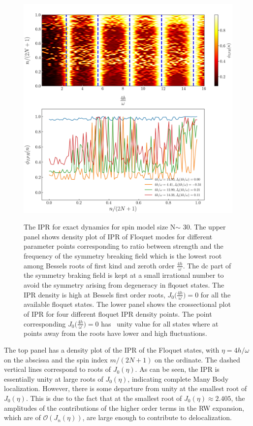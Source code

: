 \documentclass{article}
\begin{document}
\begin{figure}[ht!]
\centering
\includegraphics[height = 12.0cm, width =12cm]{ipr_exact_dynm_N50_frq_90_.jpeg}
\caption{\color{blue}The IPR for exact dynamics for spin model size N$\sim$ 30. The upper panel shows density plot of IPR of Floquet modes for different parameter points corresponding to ratio between strength and the frequency of the symmetry breaking field which is the lowest root among Bessels roots of first kind and zeroth order $\frac{4h}{\omega}$. The dc part of the symmetry braking field is kept at a small irrational number to avoid the symmetry arising from degeneracy in flqouet states. The IPR density is high at Bessels first order roots, $J_0\Big(\frac{4h}{\omega}\Big)=0$ for all the available floquet states. The lower panel shows the crossectional plot of IPR for four different floquet IPR density points. The point corresponding $J_0\Big(\frac{4h}{\omega}\Big)=0$ has ~unity value for all states where at points away from the roots have lower and high fluctuations.}
\end{figure}
The top panel has a density plot of the IPR of the Floquet states, with $\eta=4h/\omega$ on the abscissa and the spin index $m/(2N+1)$ on the ordinate. The dashed vertical lines correspond to roots of $J_0(\eta)$. As can be seen, the IPR is essentially unity at large roots of $J_0(\eta)$, indicating complete Many Body localization. However, there is some departure from unity at the smallest root of $J_0(\eta)$. This is due to the fact that at the smallest root of $J_0(\eta)\approx 2.405$, the amplitudes of the contributions of the higher order terms in the RW expansion, which are of $\mathcal{O}(J_n(\eta))$, are large enough to contribute to delocalization.
\end{document}
